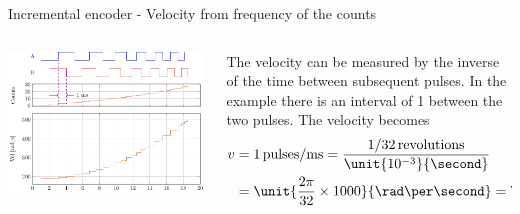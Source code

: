 \documentclass[presentation,aspectratio=169]{beamer}
\begin{document}
\begin{frame}[label={sec:org6bd94a1}]{Incremental encoder - Velocity from frequency of the counts}
\begin{columns}
\begin{column}{0.5\columnwidth}
\begin{center}
\includegraphics[width=\textwidth]{../../figures/encoder-signals-freqs}
\end{center}
\end{column}
\begin{column}{0.5\columnwidth}
The velocity can be measured by the inverse of the time between subsequent pulses. In the example there is an interval of \unit{1}{\milli\second} between the two pulses. The velocity becomes
\begin{align*}
 v &= 1 \, \text{pulses/ms} = \frac{1/32 \, \text{revolutions}}{\unit{10^{-3}}{\second}}\\
 &= \unit{\frac{2\pi}{32}\times 1000}{\rad\per\second} = \unit{196.3}{\rad\per\second}
 \end{align*}
\end{column}
\end{columns}
\end{frame}
\end{document}
